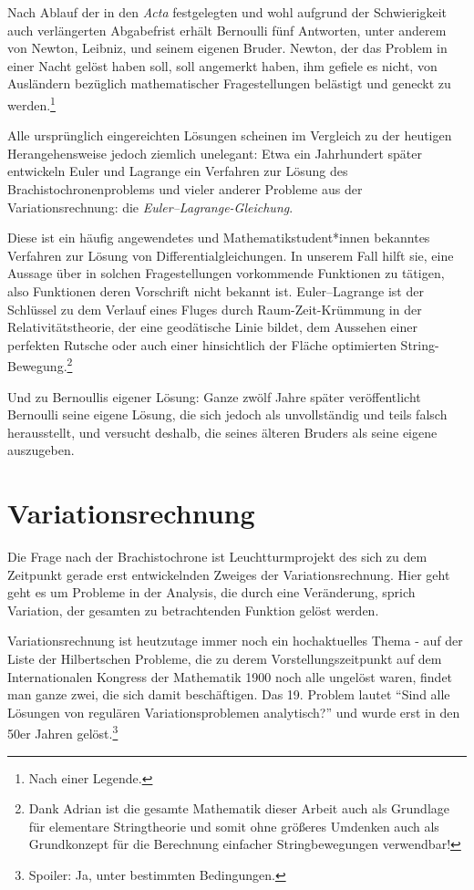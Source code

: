 Nach Ablauf der in den \textit{Acta} festgelegten und wohl aufgrund der Schwierigkeit auch verlängerten Abgabefrist erhält Bernoulli fünf Antworten, unter anderem von Newton, Leibniz, und seinem eigenen Bruder. 
Newton, der das Problem in einer Nacht gelöst haben soll, soll angemerkt haben, ihm gefiele es nicht, von Ausländern bezüglich mathematischer Fragestellungen belästigt und geneckt zu werden.\footnote{Nach einer Legende.} 

Alle ursprünglich eingereichten Lösungen scheinen im Vergleich zu der heutigen Herangehensweise jedoch ziemlich unelegant: 
Etwa ein Jahrhundert später entwickeln Euler und Lagrange ein Verfahren zur Lösung des Brachistochronenproblems und vieler anderer Probleme aus der Variationsrechnung: 
die \textit{Euler--Lagrange-Gleichung}. 

Diese ist ein häufig angewendetes und Mathematikstudent*innen bekanntes Verfahren zur Lösung von Differentialgleichungen.
In unserem Fall hilft sie, eine Aussage über in solchen Fragestellungen vorkommende Funktionen zu tätigen, also Funktionen deren Vorschrift nicht bekannt ist.
Euler--Lagrange ist der Schlüssel zu dem Verlauf eines Fluges durch Raum-Zeit-Krümmung in der Relativitätstheorie, der eine geodätische Linie bildet, dem Aussehen einer perfekten Rutsche oder auch einer hinsichtlich der Fläche optimierten String-Bewegung.\footnote{Dank Adrian ist die gesamte Mathematik dieser Arbeit auch als Grundlage für elementare Stringtheorie und somit ohne größeres Umdenken auch als Grundkonzept für die Berechnung einfacher Stringbewegungen verwendbar!} 

Und zu Bernoullis eigener Lösung:
Ganze zwölf Jahre später veröffentlicht Bernoulli seine eigene Lösung, die sich jedoch als unvollständig und teils falsch herausstellt, und versucht deshalb, die seines älteren Bruders als seine eigene auszugeben.

\section{Variationsrechnung}

Die Frage nach der Brachistochrone ist Leuchtturmprojekt des sich zu dem Zeitpunkt gerade erst entwickelnden Zweiges der Variationsrechnung. 
Hier geht geht es um Probleme in der Analysis, die durch eine Veränderung, sprich Variation, der gesamten zu betrachtenden Funktion gelöst werden.

Variationsrechnung ist heutzutage immer noch ein hochaktuelles Thema - auf der Liste der Hilbertschen Probleme, die zu derem Vorstellungszeitpunkt auf dem Internationalen Kongress der Mathematik 1900 noch alle ungelöst waren, findet man ganze zwei, die sich damit beschäftigen. 
Das 19. Problem lautet "`Sind alle Lösungen von regulären Variationsproblemen analytisch?"' und wurde erst in den 50er Jahren gelöst.\footnote{Spoiler: Ja, unter bestimmten Bedingungen.}

